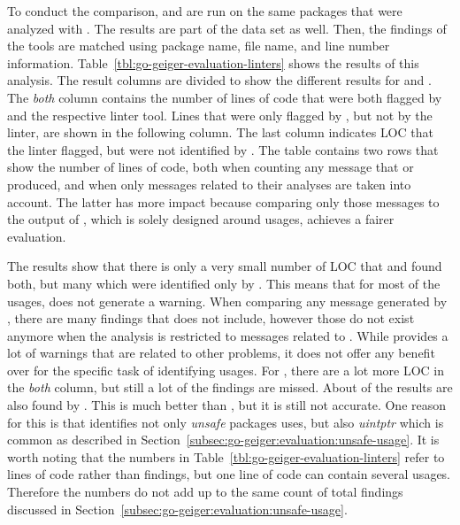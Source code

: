 To conduct the comparison, \toolVet{} and \toolGosec{} are run on the same \packagesAnalyzed{} packages that were
analyzed with \toolGeiger{}.
The results are part of the data set as well.
Then, the findings of the tools are matched using package name, file name, and line number information.
Table~\ref{tbl:go-geiger-evaluation-linters} shows the results of this analysis.
The result columns are divided to show the different results for \toolVet{} and \toolGosec{}.
The \textit{both} column contains the number of lines of code that were both flagged by \toolGeiger{} and the respective
linter tool.
Lines that were only flagged by \toolGeiger{}, but not by the linter, are shown in the following column.
The last column indicates \acrshort{LOC} that the linter flagged, but were not identified by \toolGeiger{}.
The table contains two rows that show the number of lines of code, both when counting any message that \toolVet{} or
\toolGosec{} produced, and when only messages related to their \unsafe{} analyses are taken into account.
The latter has more impact because comparing only those messages to the output of \toolGeiger{}, which is solely
designed around \unsafe{} usages, achieves a fairer evaluation.



The results show that there is only a very small number of \acrshort{LOC} that \toolVet{} and \toolGeiger{} found both,
but many which were identified only by \toolGeiger{}.
This means that for most of the \unsafe{} usages, \toolVet{} does not generate a warning.
When comparing any message generated by \toolVet{}, there are many findings that \toolGeiger{} does not include, however
those do not exist anymore when the analysis is restricted to \toolVet{} messages related to \unsafe{}.
While \toolVet{} provides a lot of warnings that are related to other problems, it does not offer any benefit over
\toolGeiger{} for the specific task of identifying \unsafe{} usages.
For \toolGosec{}, there are a lot more \acrshort{LOC} in the \textit{both} column, but still a lot of the \toolGeiger{}
findings are missed.
About  of the \toolGeiger{} results are also found by \toolGosec{}.
This is much better than \toolVet{}, but it is still not accurate.
One reason for this is that \toolGeiger{} identifies not only \textit{unsafe} packages uses, but also \textit{uintptr}
which is common as described in Section~\ref{subsec:go-geiger:evaluation:unsafe-usage}.
It is worth noting that the numbers in Table~\ref{tbl:go-geiger-evaluation-linters} refer to lines of code rather than
\unsafe{} findings, but one line of code can contain several \unsafe{} usages.
Therefore the numbers do not add up to the same count of total findings discussed in
Section~\ref{subsec:go-geiger:evaluation:unsafe-usage}.


